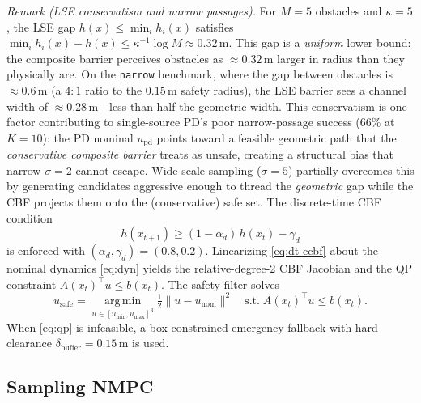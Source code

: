 \documentclass[11pt,onecolumn,a4paper]{article}
\newcommand{\pd}{\mathrm{pd}}
\newcommand{\nom}{\mathrm{nom}}
\newcommand{\safe}{\mathrm{safe}}
\begin{document}
\emph{Remark (LSE conservatism and narrow passages).}
For $M = 5$ obstacles and $\kappa = 5$, the LSE gap
$h(x) \le \min_i h_i(x)$ satisfies
$\min_i h_i(x) - h(x) \le \kappa^{-1}\log M \approx 0.32\,$m.
This gap is a \emph{uniform} lower bound: the composite barrier
perceives obstacles as ${\approx}0.32\,$m larger in radius than they
physically are. On the \texttt{narrow} benchmark, where the gap
between obstacles is ${\approx}0.6\,$m (a $4{:}1$ ratio to the
$0.15\,$m safety radius), the LSE barrier sees a channel width of
${\approx}0.28\,$m---less than half the geometric width. This
conservatism is one factor contributing to single-source PD's poor
narrow-passage success ($66\%$ at $K = 10$): the PD nominal
$u_\pd$ points toward a feasible geometric path that the
\emph{conservative composite barrier} treats as unsafe, creating a
structural bias that narrow $\sigma = 2$ cannot escape. Wide-scale
sampling ($\sigma = 5$) partially overcomes this by generating
candidates aggressive enough to thread the \emph{geometric} gap
while the CBF projects them onto the (conservative) safe set. The discrete-time CBF condition
\cite{WAN17,AME17}
\begin{equation}\label{eq:dt-ccbf}
h(x_{t+1}) \ge (1 - \alpha_d)\, h(x_t) - \gamma_d
\end{equation}
is enforced with $(\alpha_d, \gamma_d) = (0.8, 0.2)$. Linearizing
\eqref{eq:dt-ccbf} about the nominal dynamics \eqref{eq:dyn} yields
the relative-degree-2 CBF Jacobian and the QP constraint
$A(x_t)^\top u \le b(x_t)$. The safety filter solves
\begin{equation}\label{eq:qp}
u_\safe = \operatorname*{arg\,min}_{u \in [u_{\min}, u_{\max}]^3}
\tfrac{1}{2} \|u - u_\nom\|^2
\quad \text{s.t.}\; A(x_t)^\top u \le b(x_t).
\end{equation}
When \eqref{eq:qp} is infeasible, a box-constrained emergency fallback
with hard clearance $\delta_{\mathrm{buffer}} = 0.15\,\mathrm{m}$ is
used.

\subsection{Sampling NMPC}
\end{document}
